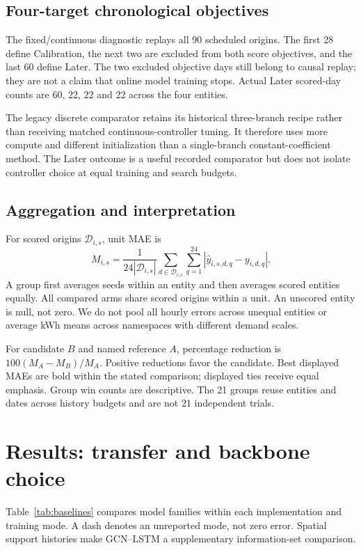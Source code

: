 \documentclass[pdflatex,iicol,sn-mathphys-num]{sn-jnl}
\begin{document}
\subsection{Four-target chronological objectives}
The fixed/continuous diagnostic replays all 90 scheduled origins. The first 28 define Calibration, the next two are excluded from both score objectives, and the last 60 define Later. The two excluded objective days still belong to causal replay; they are not a claim that online model training stops. Actual Later scored-day counts are 60, 22, 22 and 22 across the four entities.

The legacy discrete comparator retains its historical three-branch recipe rather than receiving matched continuous-controller tuning. It therefore uses more compute and different initialization than a single-branch constant-coefficient method. The Later outcome is a useful recorded comparator but does not isolate controller choice at equal training and search budgets.

\subsection{Aggregation and interpretation}
For scored origins $\mathcal D_{i,s}$, unit MAE is
\begin{equation}
M_{i,s}=\frac{1}{24|\mathcal D_{i,s}|}
\sum_{d\in\mathcal D_{i,s}}\sum_{q=1}^{24}
|\hat y_{i,s,d,q}-y_{i,d,q}|.
\label{eq:mae}\end{equation}
A group first averages seeds within an entity and then averages scored entities equally. All compared arms share scored origins within a unit. An unscored entity is null, not zero. We do not pool all hourly errors across unequal entities or average kWh means across namespaces with different demand scales.

For candidate $B$ and named reference $A$, percentage reduction is $100(M_A-M_B)/M_A$. Positive reductions favor the candidate. Best displayed MAEs are bold within the stated comparison; displayed ties receive equal emphasis. Group win counts are descriptive. The 21 groups reuse entities and dates across history budgets and are not 21 independent trials.

\section{Results: transfer and backbone choice}

Table~\ref{tab:baselines} compares model families within each implementation and training mode. A dash denotes an unreported mode, not zero error. Spatial support histories make GCN--LSTM a supplementary information-set comparison.
\end{document}
